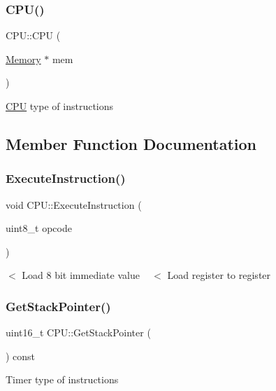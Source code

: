 \subsubsection{\texorpdfstring{C\+P\+U()}{CPU()}}
{\footnotesize\ttfamily C\+P\+U\+::\+C\+PU (\begin{DoxyParamCaption}\item[{\mbox{\hyperlink{classMemory}{Memory}} $\ast$}]{mem }\end{DoxyParamCaption})}

\mbox{\hyperlink{classCPU}{C\+PU}} type of instructions 

\subsection{Member Function Documentation}
\mbox{\label{classCPU_ad8e103aaedd1c250d33f9cc373f2f16b}} 
\subsubsection{\texorpdfstring{Execute\+Instruction()}{ExecuteInstruction()}}
{\footnotesize\ttfamily void C\+P\+U\+::\+Execute\+Instruction (\begin{DoxyParamCaption}\item[{uint8\+\_\+t}]{opcode }\end{DoxyParamCaption})}

$<$ Load 8 bit immediate value ~\newline
 $<$ Load register to register \mbox{\label{classCPU_a570d34ada158ddb45f8ba8dc0e5f218a}} 
\subsubsection{\texorpdfstring{Get\+Stack\+Pointer()}{GetStackPointer()}}
{\footnotesize\ttfamily uint16\+\_\+t C\+P\+U\+::\+Get\+Stack\+Pointer (\begin{DoxyParamCaption}{ }\end{DoxyParamCaption}) const}

Timer type of instructions \mbox{\label{classCPU_a72afeb809bf193928349e6f948f60bfc}} 
